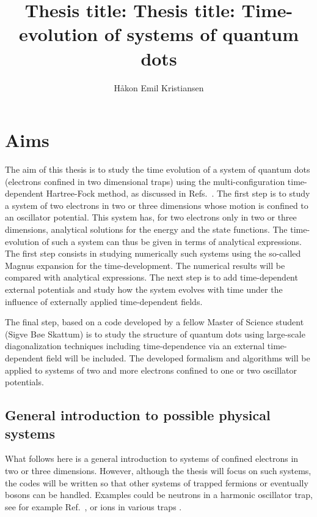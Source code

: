 \documentclass[10pt]{revtex4}
\begin{document}
\title{Thesis title: Thesis title: Time-evolution of  systems of quantum dots}
\author{H\aa kon Emil Kristiansen}
\maketitle
\section*{Aims}
The aim of this thesis is to study the time evolution of a system of quantum dots (electrons confined in
two dimensional traps) using the multi-configuration time-dependent Hartree-Fock method, as discussed in Refs.~\cite{mcthf,sigve2013}. The first step is to study a system of two electrons in two or three dimensions whose motion is confined  to an oscillator potential. This system has, for two electrons only in two or three dimensions, 
analytical solutions for the energy and the state functions. The time-evolution of such a system can thus be given in terms of analytical expressions. The first step consists in studying numerically such systems using the so-called Magnus expansion for the time-development. The numerical results will be compared with analytical expressions. The next step is to add time-dependent external potentials and study how the system evolves with time under the influence of externally applied time-dependent fields. 


The final step, based on a code developed by a fellow Master of Science student (Sigve B\o e Skattum) is to 
study the structure of quantum dots using large-scale diagonalization techniques including  time-dependence via an external time-dependent field will be included.  The developed formalism and algorithms will be applied to systems of two and more electrons confined to one or two oscillator potentials. 

\subsection*{General introduction to possible physical systems}




What follows here is a general introduction to systems of confined electrons in two or three dimensions.
However, although the thesis will focus on such systems, the codes will be written so 
that other systems of trapped 
fermions or eventually bosons can be handled. Examples could be neutrons in a harmonic oscillator trap, see for example Ref.~\cite{bogner2011}, or ions in various traps \cite{yoram2008}.  
\end{document}
